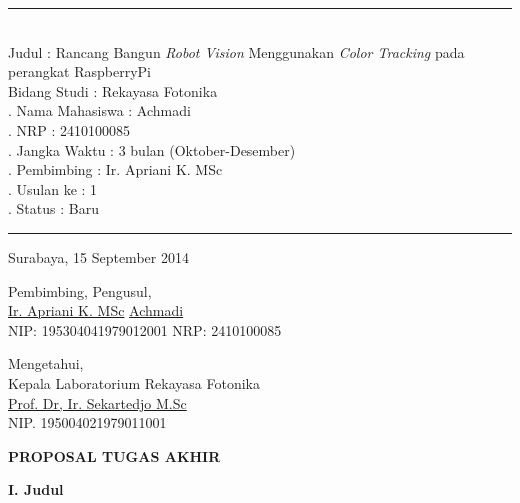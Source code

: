\documentclass[a4paper,12pt]{article}
\begin{document}
\rule{385pt}{5pt}\\
\noindent Judul \hspace{80pt} : Rancang Bangun \textit{Robot Vision} Menggunakan \textit{Color Tracking} pada perangkat RaspberryPi\\[5pt]
\noindent Bidang Studi \hspace{42pt} : Rekayasa Fotonika\\[5pt]
. Nama Mahasiswa \hspace{5pt} : Achmadi\\[5pt]
. NRP  \hspace{70pt} : 2410100085\\[5pt]
. Jangka Waktu \hspace{20pt} : 3 bulan (Oktober-Desember)\\[5pt]
. Pembimbing \hspace{28pt} : Ir. Apriani K. MSc\\[5pt]
. Usulan ke \hspace{40pt} : 1\\[5pt]
. Status \hspace{60pt} : Baru\\[5pt]
\rule{385pt}{5pt}
\begin{flushright}
  Surabaya, 15 September 2014
\end{flushright}
\begin{flushleft}
Pembimbing, \hspace{230pt} Pengusul, 
\\[40pt]
\underline{Ir. Apriani K. MSc} \hspace{200pt} \underline{Achmadi}\\
NIP: 195304041979012001 \hspace{150pt} NRP: 2410100085
\\[40pt]
\end{flushleft}
\begin{center}
  Mengetahui,\\
  Kepala Laboratorium Rekayasa Fotonika
  \\[40pt]
  \underline{Prof. Dr, Ir. Sekartedjo M.Sc}\\
  NIP. 195004021979011001
\end{center}
\newpage
\begin{center}
 \textbf{PROPOSAL TUGAS AKHIR}
\end{center}
\noindent \textbf{I. \hspace{10pt} Judul}
\end{document}
